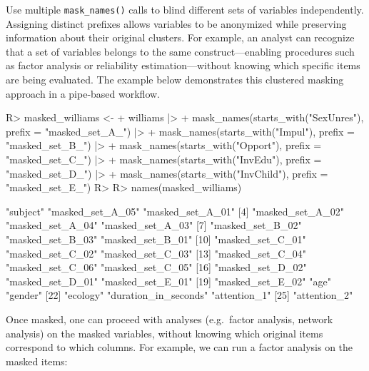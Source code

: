 \documentclass[
]{jss}
\begin{document}
Use multiple \texttt{mask\_names()} calls to blind different sets of
variables independently. Assigning distinct prefixes allows variables to
be anonymized while preserving information about their original
clusters. For example, an analyst can recognize that a set of variables
belongs to the same construct---enabling procedures such as factor
analysis or reliability estimation---without knowing which specific
items are being evaluated. The example below demonstrates this clustered
masking approach in a pipe-based workflow.

\begin{CodeChunk}
\begin{CodeInput}
R> masked_williams <- 
+     williams |> 
+     mask_names(starts_with("SexUnres"), prefix = "masked_set_A_") |>  
+     mask_names(starts_with("Impul"), prefix = "masked_set_B_") |> 
+     mask_names(starts_with("Opport"), prefix = "masked_set_C_") |> 
+     mask_names(starts_with("InvEdu"), prefix = "masked_set_D_") |> 
+     mask_names(starts_with("InvChild"), prefix = "masked_set_E_")
R> 
R> names(masked_williams)
\end{CodeInput}
\begin{CodeOutput}
 [1] "subject"             "masked_set_A_05"     "masked_set_A_01"    
 [4] "masked_set_A_02"     "masked_set_A_04"     "masked_set_A_03"    
 [7] "masked_set_B_02"     "masked_set_B_03"     "masked_set_B_01"    
[10] "masked_set_C_01"     "masked_set_C_02"     "masked_set_C_03"    
[13] "masked_set_C_04"     "masked_set_C_06"     "masked_set_C_05"    
[16] "masked_set_D_02"     "masked_set_D_01"     "masked_set_E_01"    
[19] "masked_set_E_02"     "age"                 "gender"             
[22] "ecology"             "duration_in_seconds" "attention_1"        
[25] "attention_2"        
\end{CodeOutput}
\end{CodeChunk}

Once masked, one can proceed with analyses (e.g.~factor analysis,
network analysis) on the masked variables, without knowing which
original items correspond to which columns. For example, we can run a
factor analysis on the masked items:
\end{document}
